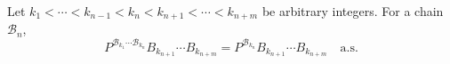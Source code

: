 Let $k_1 < \cdots < k_{n-1} < k_n < k_{n+1} < \cdots < k_{n+m}$ be arbitrary integers. For a chain $\mathcal{B}_n$, $$P^{\mathcal{B}_{k_1} \cdots \mathcal{B}_{k_n}} B_{k_{n+1}} \cdots B_{k_{n+m}} = P^{\mathcal{B}_{k_n}} B_{k_{n+1}} \cdots B_{k_{n+m}} \quad \text{a.s.}$$
